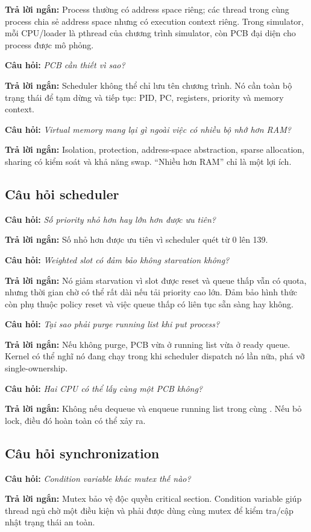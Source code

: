 \documentclass[12pt,a4paper]{article}
\newcommand{\code}[1]{\texttt{\detokenize{#1}}}
\newcommand{\question}[1]{\textbf{\color{bkgold}Câu hỏi:} \textit{#1}}
\newcommand{\answer}{\textbf{\color{bkblue}Trả lời ngắn:} }
\begin{document}
\answer Process thường có address space riêng; các thread trong cùng process
chia sẻ address space nhưng có execution context riêng. Trong simulator, mỗi
CPU/loader là pthread của chương trình simulator, còn PCB đại diện cho process
được mô phỏng.

\question{PCB cần thiết vì sao?}

\answer Scheduler không thể chỉ lưu tên chương trình. Nó cần toàn bộ trạng
thái để tạm dừng và tiếp tục: PID, PC, registers, priority và memory context.

\question{Virtual memory mang lại gì ngoài việc có nhiều bộ nhớ hơn RAM?}

\answer Isolation, protection, address-space abstraction, sparse allocation,
sharing có kiểm soát và khả năng swap. ``Nhiều hơn RAM'' chỉ là một lợi ích.

\subsection{Câu hỏi scheduler}

\question{Số priority nhỏ hơn hay lớn hơn được ưu tiên?}

\answer Số nhỏ hơn được ưu tiên vì scheduler quét từ 0 lên 139.

\question{Weighted slot có đảm bảo không starvation không?}

\answer Nó giảm starvation vì slot được reset và queue thấp vẫn có quota,
nhưng thời gian chờ có thể rất dài nếu tải priority cao lớn. Đảm bảo hình thức
còn phụ thuộc policy reset và việc queue thấp có liên tục sẵn sàng hay không.

\question{Tại sao phải purge running list khi put process?}

\answer Nếu không purge, PCB vừa ở running list vừa ở ready queue. Kernel có
thể nghĩ nó đang chạy trong khi scheduler dispatch nó lần nữa, phá vỡ
single-ownership.

\question{Hai CPU có thể lấy cùng một PCB không?}

\answer Không nếu \code{get_proc()} dequeue và enqueue running list trong cùng
\code{queue_lock}. Nếu bỏ lock, điều đó hoàn toàn có thể xảy ra.

\subsection{Câu hỏi synchronization}

\question{Condition variable khác mutex thế nào?}

\answer Mutex bảo vệ độc quyền critical section. Condition variable giúp
thread ngủ chờ một điều kiện và phải được dùng cùng mutex để kiểm tra/cập nhật
trạng thái an toàn.
\end{document}
